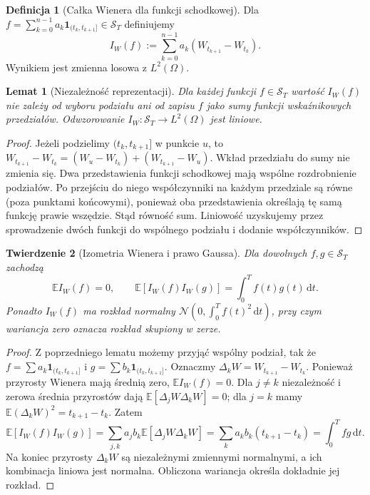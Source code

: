 \documentclass[11pt,a4paper,oneside]{report}
\numberwithin{equation}{chapter}
\theoremstyle{plain}
\newtheorem{twierdzenie}{Twierdzenie}[chapter]
\newtheorem{lemat}[twierdzenie]{Lemat}
\theoremstyle{definition}
\newtheorem{definicja}{Definicja}[chapter]
\theoremstyle{remark}
\newcommand{\E}{\mathbb{E}}
\newcommand{\calS}{\mathcal{S}}
\newcommand{\ind}[1]{\mathbf{1}_{#1}}
\newcommand{\dd}{\mathrm{d}}
\newcommand{\Normal}{\mathcal{N}}
\begin{document}
\begin{definicja}[Całka Wienera dla funkcji schodkowej]
Dla $f=\sum_{k=0}^{n-1}a_k\ind{(t_k,t_{k+1}]}\in\calS_T$
definiujemy
\[
I_W(f):=\sum_{k=0}^{n-1}a_k(W_{t_{k+1}}-W_{t_k}).
\tag{1.1}\label{eq:wiener-simple}
\]
Wynikiem jest zmienna losowa z $L^2(\Omega)$.
\end{definicja}

\begin{lemat}[Niezależność reprezentacji]
Dla każdej funkcji $f\in\calS_T$ wartość $I_W(f)$
nie zależy od wyboru podziału ani od zapisu $f$ jako sumy
funkcji wskaźnikowych przedziałów. Odwzorowanie
$I_W:\calS_T\to L^2(\Omega)$ jest liniowe.
\end{lemat}
\begin{proof}
Jeżeli podzielimy $(t_k,t_{k+1}]$ w punkcie $u$, to
$W_{t_{k+1}}-W_{t_k}=(W_u-W_{t_k})+(W_{t_{k+1}}-W_u)$.
Wkład przedziału do sumy nie zmienia się. Dwa przedstawienia
funkcji schodkowej mają wspólne rozdrobnienie podziałów.
Po przejściu do niego współczynniki na każdym przedziale są
równe (poza punktami końcowymi), ponieważ oba przedstawienia
określają tę samą funkcję prawie wszędzie. Stąd równość sum.
Liniowość uzyskujemy przez sprowadzenie dwóch funkcji do
wspólnego podziału i dodanie współczynników.
\end{proof}

\begin{twierdzenie}[Izometria Wienera i prawo Gaussa]\label{th:wiener-isometry}
Dla dowolnych $f,g\in\calS_T$ zachodzą
\[
\E I_W(f)=0,\qquad
\E[I_W(f)I_W(g)]=\int_0^T f(t)g(t)\,\dd t.
\tag{1.2}\label{eq:wienscalar}
\]
Ponadto $I_W(f)$ ma rozkład normalny
$\Normal(0,\int_0^Tf(t)^2\,\dd t)$,
przy czym wariancja zero oznacza rozkład skupiony w zerze.
\end{twierdzenie}
\begin{proof}
Z poprzedniego lematu możemy przyjąć wspólny podział,
tak że $f=\sum a_k\ind{(t_k,t_{k+1}]}$ i
$g=\sum b_k\ind{(t_k,t_{k+1}]}$. Oznaczmy
$\Delta_kW=W_{t_{k+1}}-W_{t_k}$. Ponieważ przyrosty Wienera
mają średnią zero, $\E I_W(f)=0$. Dla $j\ne k$
niezależność i zerowa średnia przyrostów dają
$\E[\Delta_jW\Delta_kW]=0$; dla $j=k$ mamy
$\E(\Delta_kW)^2=t_{k+1}-t_k$. Zatem
\[
\E[I_W(f)I_W(g)]
=\sum_{j,k}a_jb_k\E[\Delta_jW\Delta_kW]
=\sum_k a_kb_k(t_{k+1}-t_k)
=\int_0^Tfg\,\dd t.
\]
Na koniec przyrosty $\Delta_kW$ są niezależnymi zmiennymi
normalnymi, a ich kombinacja liniowa jest normalna.
Obliczona wariancja określa dokładnie jej rozkład.
\end{proof}
\end{document}
